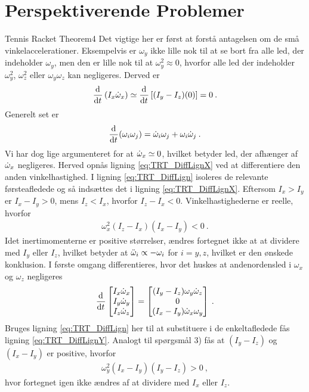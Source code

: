 \section*{Perspektiverende Problemer}
%
%
\begin{opgave}{Tennis Racket Theorem}{4}
Det vigtige her er først at forstå antagelsen om de små vinkelaccelerationer. Eksempelvis er $\omega_y$ ikke lille nok til at se bort fra alle led, der indeholder $\omega_y$, men den er lille nok til at $\omega_y^2 \approx 0$, hvorfor alle led der indeholder $\omega_y^2$, $\omega_z^2$ eller $\omega_y\omega_z$ kan negligeres.
\opg Derved er
\begin{align*}
	\frac{\mathrm{d}^{}{}}{{\mathrm{d} {t}}^{}}\left(I_x\dot{\omega}_x\right) \simeq \frac{\mathrm{d}^{}{}}{{\mathrm{d} {t}}^{}}\left[(I_y-I_z)(0)\right] = 0 \: .
\end{align*}
Generelt set er
\begin{align*}
	\frac{\mathrm{d}^{}{}}{{\mathrm{d} {t}}^{}}(\omega_i\omega_j) = \dot{\omega}_i\omega_j + \omega_i\dot{\omega}_j \: .
\end{align*}
Vi har dog lige argumenteret for at $\dot{\omega}_x \simeq 0$, hvilket betyder led, der afhænger af $\dot{\omega}_x$ negligeres. Herved opnås ligning \eqref{eq:TRT_DiffLignX} ved at differentiere den anden vinkelhastighed.
\opg I ligning \eqref{eq:TRT_DiffLign} isoleres de relevante førsteafledede og så indsættes det i ligning \eqref{eq:TRT_DiffLignX}.
\opg Eftersom $I_x>I_y$ er $I_x-I_y > 0$, mens $I_z<I_x$, hvorfor $I_z-I_x<0$. Vinkelhastighederne er reelle, hvorfor
\begin{align*}
	\omega_x^2(I_z-I_x)(I_x-I_y) < 0 \: .
\end{align*}
Idet inertimomenterne er positive størrelser, ændres fortegnet ikke at at dividere med $I_y$ eller $I_z$, hvilket betyder at $\ddot{\omega}_i \propto -\omega_i$ for $i=y,z$, hvilket er den ønskede konklusion.
\opg I første omgang differentieres, hvor det huskes at andenordensled i $\omega_x$ og $\omega_z$ negligeres
\begin{align*}
	\frac{\mathrm{d}^{}{}}{{\mathrm{d} {t}}^{}}\begin{bmatrix} I_x\dot{\omega}_x \\ I_y\dot{\omega}_y \\ I_z\dot{\omega}_z \end{bmatrix} = \begin{bmatrix} (I_y-I_z)\omega_y\dot{\omega}_z \\ 0 \\ (I_x-I_y)\dot{\omega}_x\omega_y \end{bmatrix} \: .
\end{align*}
Bruges ligning \eqref{eq:TRT_DiffLign} her til at substituere i de enkeltafledede fås ligning \eqref{eq:TRT_DiffLignY}.
\opg Analogt til spørgsmål 3) fås at $(I_y-I_z)$ og $(I_x-I_y)$ er positive, hvorfor
\begin{align*}
	\omega_y^2(I_x-I_y)(I_y-I_z) > 0 \: ,
\end{align*}
hvor fortegnet igen ikke ændres af at dividere med $I_x$ eller $I_z$.

\end{opgave}
